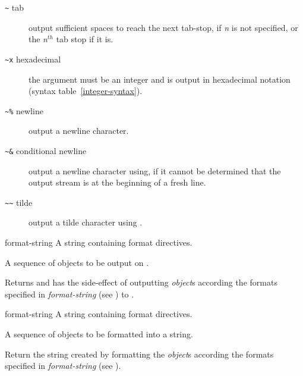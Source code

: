 \begin{optDefinition}
\begin{description}
    \item[{\tt\textasciitilde}\true\/ tab]%
    output sufficient spaces to reach the next tab-stop, if {\em n\/} is not
    specified, or the {\em n$^{th}$} tab stop if it is.

    \item[{\tt\textasciitilde x} hexadecimal]%
    the argument must be an integer and is output in hexadecimal notation
    (syntax table~\ref{integer-syntax}).

    \item[{\tt\textasciitilde \%} newline]%
    output a newline character.

    \item[{\tt\textasciitilde \&} conditional newline]%
    output a newline character using, if it cannot be determined that the output
    stream is at the beginning of a fresh line.

    \item[{\tt\textasciitilde \textasciitilde} tilde]%
    output a tilde character using .
\end{description}

%
\begin{arguments}
    \item[format-string] A string containing format directives.
    \item[\optional{object$_1$ \ldots}] A sequence of objects to be output
    on .
\end{arguments}
\result%
Returns  and has the side-effect of outputting {\em
    object\/}s according the formats specified in {\em format-string} (see
) to .

%
\begin{arguments}
    \item[format-string] A string containing format directives.
    \item[\optional{object$_1$ \ldots}] A sequence of objects to be formatted
    into a string.
\end{arguments}
%
\remarks%
Return the string created by formatting the {\em object\/}s according the
formats specified in {\em format-string} (see ).

\end{optDefinition}
